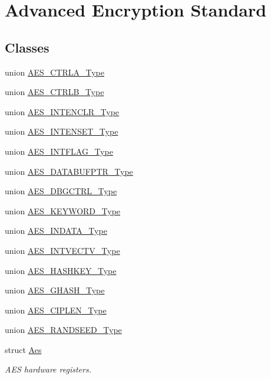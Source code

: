 \hypertarget{group___s_a_m_l21___a_e_s}{}\section{Advanced Encryption Standard}
\label{group___s_a_m_l21___a_e_s}
\subsection*{Classes}
\begin{DoxyCompactItemize}
\item 
union \hyperlink{union_a_e_s___c_t_r_l_a___type}{A\+E\+S\+\_\+\+C\+T\+R\+L\+A\+\_\+\+Type}
\item 
union \hyperlink{union_a_e_s___c_t_r_l_b___type}{A\+E\+S\+\_\+\+C\+T\+R\+L\+B\+\_\+\+Type}
\item 
union \hyperlink{union_a_e_s___i_n_t_e_n_c_l_r___type}{A\+E\+S\+\_\+\+I\+N\+T\+E\+N\+C\+L\+R\+\_\+\+Type}
\item 
union \hyperlink{union_a_e_s___i_n_t_e_n_s_e_t___type}{A\+E\+S\+\_\+\+I\+N\+T\+E\+N\+S\+E\+T\+\_\+\+Type}
\item 
union \hyperlink{union_a_e_s___i_n_t_f_l_a_g___type}{A\+E\+S\+\_\+\+I\+N\+T\+F\+L\+A\+G\+\_\+\+Type}
\item 
union \hyperlink{union_a_e_s___d_a_t_a_b_u_f_p_t_r___type}{A\+E\+S\+\_\+\+D\+A\+T\+A\+B\+U\+F\+P\+T\+R\+\_\+\+Type}
\item 
union \hyperlink{union_a_e_s___d_b_g_c_t_r_l___type}{A\+E\+S\+\_\+\+D\+B\+G\+C\+T\+R\+L\+\_\+\+Type}
\item 
union \hyperlink{union_a_e_s___k_e_y_w_o_r_d___type}{A\+E\+S\+\_\+\+K\+E\+Y\+W\+O\+R\+D\+\_\+\+Type}
\item 
union \hyperlink{union_a_e_s___i_n_d_a_t_a___type}{A\+E\+S\+\_\+\+I\+N\+D\+A\+T\+A\+\_\+\+Type}
\item 
union \hyperlink{union_a_e_s___i_n_t_v_e_c_t_v___type}{A\+E\+S\+\_\+\+I\+N\+T\+V\+E\+C\+T\+V\+\_\+\+Type}
\item 
union \hyperlink{union_a_e_s___h_a_s_h_k_e_y___type}{A\+E\+S\+\_\+\+H\+A\+S\+H\+K\+E\+Y\+\_\+\+Type}
\item 
union \hyperlink{union_a_e_s___g_h_a_s_h___type}{A\+E\+S\+\_\+\+G\+H\+A\+S\+H\+\_\+\+Type}
\item 
union \hyperlink{union_a_e_s___c_i_p_l_e_n___type}{A\+E\+S\+\_\+\+C\+I\+P\+L\+E\+N\+\_\+\+Type}
\item 
union \hyperlink{union_a_e_s___r_a_n_d_s_e_e_d___type}{A\+E\+S\+\_\+\+R\+A\+N\+D\+S\+E\+E\+D\+\_\+\+Type}
\item 
struct \hyperlink{struct_aes}{Aes}
\begin{DoxyCompactList}\small\item\em A\+E\+S hardware registers. \end{DoxyCompactList}\end{DoxyCompactItemize}

